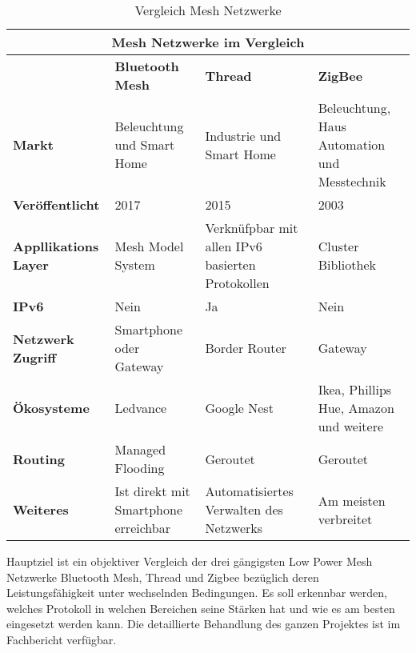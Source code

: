 \begin{table}[h]
	\centering
	\begin{adjustbox}{width=1\textwidth}
		\begin{tabular}{@{}|l|l|l|l|@{}}
			\toprule
			\multicolumn{4}{|c|}{\textbf{Mesh Netzwerke im Vergleich}}                                                                                                            \\ \midrule
			& \textbf{Bluetooth Mesh}              & \textbf{Thread}                                  & \textbf{ZigBee}                              \\ \midrule
			\textbf{Markt}               & Beleuchtung und Smart Home           & Industrie und Smart Home                         & Beleuchtung, Haus Automation und Messtechnik \\ \midrule
			\textbf{Veröffentlicht}      & 2017                                 & 2015                                             & 2003                                         \\ \midrule
			\textbf{Appllikations Layer} & Mesh Model System                    & Verknüfpbar mit allen IPv6 basierten Protokollen & Cluster Bibliothek                           \\ \midrule
			\textbf{IPv6}                & Nein                                 & Ja                                               & Nein                                         \\ \midrule
			\textbf{Netzwerk Zugriff}    & Smartphone oder Gateway              & Border Router                                    & Gateway                                      \\ \midrule
			\textbf{Ökosysteme}          & Ledvance                             & Google Nest                                      & Ikea, Phillips Hue, Amazon und weitere       \\ \midrule
			\textbf{Routing}             & Managed Flooding                     & Geroutet                                         & Geroutet                                     \\ \midrule
			\textbf{Weiteres}            & Ist direkt mit Smartphone erreichbar & Automatisiertes Verwalten des Netzwerks          & Am meisten verbreitet                        \\ \bottomrule
		\end{tabular}
	\end{adjustbox}
	\caption{Vergleich Mesh Netzwerke}\label{table:VergleichMeshNetzwerk}
\end{table}

Hauptziel ist ein objektiver Vergleich der drei gängigsten Low Power Mesh Netzwerke Bluetooth Mesh, Thread und Zigbee bezüglich deren Leistungsfähigkeit unter wechselnden Bedingungen. Es soll erkennbar werden, welches Protokoll in welchen Bereichen seine Stärken hat und wie es am besten eingesetzt werden kann. Die detaillierte Behandlung des ganzen Projektes ist im Fachbericht verfügbar.

